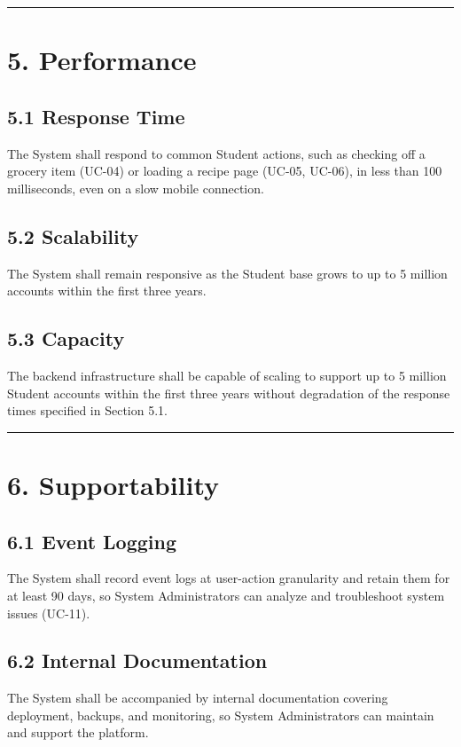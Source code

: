 \documentclass[10pt,letterpaper]{article}
\newcommand{\ucseparator}{\vspace{1em}\noindent\rule{\linewidth}{0.4pt}\vspace{1.5em}}
\begin{document}
\ucseparator

\section*{5. Performance}

\subsection*{5.1 Response Time}
The System shall respond to common Student actions, such as checking off a grocery item (UC-04) or loading a recipe page (UC-05, UC-06), in less than 100 milliseconds, even on a slow mobile connection.

\subsection*{5.2 Scalability}
The System shall remain responsive as the Student base grows to up to 5 million accounts within the first three years.

\subsection*{5.3 Capacity}
The backend infrastructure shall be capable of scaling to support up to 5 million Student accounts within the first three years without degradation of the response times specified in Section 5.1.

\ucseparator

\section*{6. Supportability}

\subsection*{6.1 Event Logging}
The System shall record event logs at user-action granularity and retain them for at least 90 days, so System Administrators can analyze and troubleshoot system issues (UC-11).

\subsection*{6.2 Internal Documentation}
The System shall be accompanied by internal documentation covering deployment, backups, and monitoring, so System Administrators can maintain and support the platform.
\end{document}
